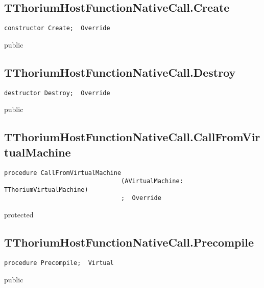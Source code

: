 \subsection{TThoriumHostFunctionNativeCall.Create}
\label{thoriumcore:thorium:tthoriumhostfunctionnativecall:create}
\begin{FPCList}
\Synopsis
\Declaration 

\begin{verbatim}
constructor Create;  Override
\end{verbatim}
\Visibility
public
\Description
\Errors
\end{FPCList}
\subsection{TThoriumHostFunctionNativeCall.Destroy}
\label{thoriumcore:thorium:tthoriumhostfunctionnativecall:destroy}
\begin{FPCList}
\Synopsis
\Declaration 

\begin{verbatim}
destructor Destroy;  Override
\end{verbatim}
\Visibility
public
\Description
\Errors
\end{FPCList}
\subsection{TThoriumHostFunctionNativeCall.CallFromVirtualMachine}
\label{thoriumcore:thorium:tthoriumhostfunctionnativecall:callfromvirtualmachine}
\begin{FPCList}
\Synopsis
\Declaration 

\begin{verbatim}
procedure CallFromVirtualMachine
                                (AVirtualMachine: TThoriumVirtualMachine)
                                ;  Override
\end{verbatim}
\Visibility
protected
\Description
\Errors
\end{FPCList}
\subsection{TThoriumHostFunctionNativeCall.Precompile}
\label{thoriumcore:thorium:tthoriumhostfunctionnativecall:precompile}
\begin{FPCList}
\Synopsis
\Declaration 

\begin{verbatim}
procedure Precompile;  Virtual
\end{verbatim}
\Visibility
public
\Description
\Errors
\end{FPCList}
